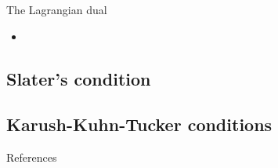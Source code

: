 \documentclass{beamer}
\numberwithin{equation}{section}
\begin{document}
\begin{frame}{The Lagrangian dual}
    \begin{itemize}
        \item
    \end{itemize}
\end{frame}

\subsection{Slater's condition}

\subsection{Karush-Kuhn-Tucker conditions}


\begin{frame}{References}
    
    
\end{frame}
\end{document}

